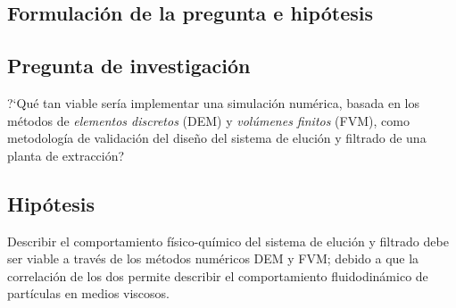 \begin{center}
	\section{Formulaci\'on de la pregunta e hip\'otesis}
\end{center}

\subsection{Pregunta de investigaci\'on}

\noindent
\justify

?`Qu\'e tan viable ser\'ia implementar una simulaci\'on num\'erica, basada en los m\'etodos de \textit{elementos discretos} (DEM) y \textit{vol\'umenes finitos} (FVM), como metodolog\'ia de validaci\'on del dise\~no del sistema de eluci\'on y filtrado de una planta de extracci\'on?

\subsection{Hip\'otesis}

\noindent
\justify

Describir el comportamiento f\'isico-qu\'imico del sistema de eluci\'on y filtrado debe ser viable a trav\'es de los m\'etodos num\'ericos DEM y FVM; debido a que la correlaci\'on de los dos permite describir el comportamiento fluidodin\'amico de part\'iculas en medios viscosos.